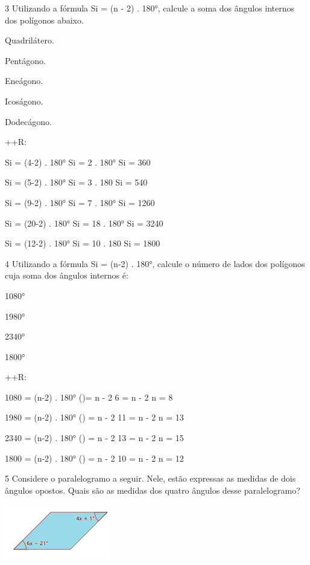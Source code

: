 {\num{3} Utilizando a fórmula Si = (n - 2) . 180°, calcule a soma dos ângulos
internos dos polígonos abaixo.
\item Quadrilátero.
\item Pentágono.
\item Eneágono.
\item Icoságono.
\item Dodecágono.

++R:
\item Si = (4-2) . 180°
Si = 2 . 180°
Si = 360

\item Si = (5-2) . 180°
Si = 3 . 180
Si = 540

\item Si = (9-2) . 180°
Si = 7 . 180°
Si = 1260

\item Si = (20-2) . 180°
Si = 18 . 180°
Si = 3240

\item Si = (12-2) . 180°
Si = 10 . 180
Si = 1800

\num{4} Utilizando a fórmula Si = (n-2) . 180°, calcule o número de lados dos
polígonos cuja soma dos ângulos internos é:
\item 1080°
\item 1980°
\item 2340°
\item 1800°

++R:
\item 1080 = (n-2) . 180°
()= n - 2
6 = n - 2
n = 8

\item 1980 = (n-2) . 180°
() = n - 2
11 = n - 2
n = 13

\item 2340 = (n-2) . 180°
() = n - 2
13 = n - 2
n = 15

\item 1800 = (n-2) . 180°
() = n - 2
10 = n - 2
n = 12

\num{5} Considere o paralelogramo a seguir. Nele, estão expressas as medidas
de dois ângulos opostos. Quais são as medidas dos quatro ângulos desse
paralelogramo?

\includegraphics[width=1.82292in,height=0.95833in]{./imgSAEB_8_MAT/media/image9.png}

}
